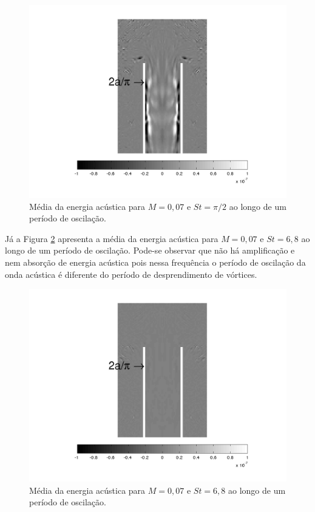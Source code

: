 \begin{figure}[ht!]
\centering
  \includegraphics[width=0.62\linewidth]{figuras/max_007_media.png}
  \caption[Média da energia acústica para $M = 0,07$ e $St = \pi/2$.]{Média da energia acústica para $M = 0,07$ e $St = \pi/2$ ao longo de um período de oscilação.}
  \label{fig:max_007_media}
\end{figure}

Já a Figura \ref{fig:min_007_media} apresenta a média da energia acústica para $M = 0,07$ e $St = 6,8$ ao longo de um período de oscilação. Pode-se observar que não há amplificação e nem absorção de energia acústica pois nessa frequência o período de oscilação da onda acústica é diferente do período de desprendimento de vórtices. 

\begin{figure}[ht!]
\centering
  \includegraphics[width=0.62\linewidth]{figuras/min_007_media.png}
  \caption[Média da energia acústica para $M = 0,07$ e $St = 6,8$.]{Média da energia acústica para $M = 0,07$ e $St = 6,8$ ao longo de um período de oscilação.}
  \label{fig:min_007_media}
\end{figure}
\vfill
\clearpage

\newpage
\begin{figure}[ht!]
\centering
  
\end{figure}

